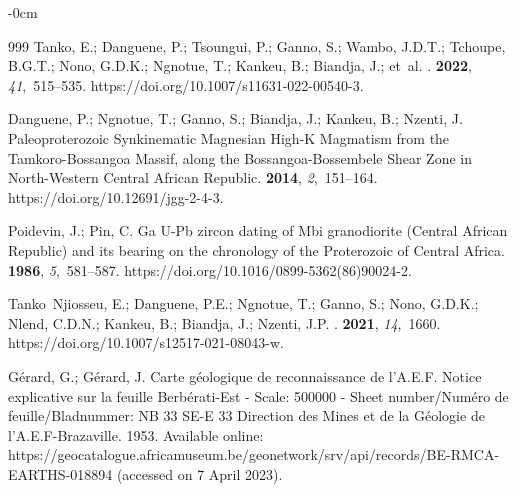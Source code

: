\documentclass[minerals,article,accept,pdftex,moreauthors]{Definitions/mdpi}
\begin{document}
\begin{adjustwidth}{-\extralength}{0cm}
\begin{thebibliography}{999}
Tanko, E.; Danguene, P.; Tsoungui, P.; Ganno, S.; Wambo, J.D.T.; Tchoupe,
  B.G.T.; Nono, G.D.K.; Ngnotue, T.; Kankeu, B.; Biandja, J.;  et~al.
.
 {\bf 2022}, {\em 41},~515--535.
\newblock https://doi.org/10.1007/s11631-022-00540-3.

Danguene, P.; Ngnotue, T.; Ganno, S.; Biandja, J.; Kankeu, B.; Nzenti, J.
\newblock Paleoproterozoic Synkinematic Magnesian High-K Magmatism from the
  Tamkoro-Bossangoa Massif, along the Bossangoa-Bossembele Shear Zone in
  North-Western Central African Republic.
 {\bf 2014}, {\em
  2},~151--164.
\newblock https://doi.org/10.12691/jgg-2-4-3.

Poidevin, J.; Pin, C.
 Ga U-Pb zircon dating of Mbi granodiorite (Central African
  Republic) and its bearing on the chronology of the Proterozoic of Central
  Africa.
 {\bf 1986}, {\em
  5},~581--587.
\newblock https://doi.org/10.1016/0899-5362(86)90024-2.
\newpage

Tanko~Njiosseu, E.; Danguene, P.E.; Ngnotue, T.; Ganno, S.; Nono, G.D.K.;
  Nlend, C.D.N.; Kankeu, B.; Biandja, J.; Nzenti, J.P.
.
 {\bf 2021}, {\em 14},~1660.
\newblock https://doi.org/10.1007/s12517-021-08043-w.

Gérard, G.; Gérard, J.
\newblock Carte géologique de reconnaissance de l'A.E.F.
\newblock  Notice explicative sur la feuille Berbérati-Est - Scale: 500000 - Sheet number/Numéro de feuille/Bladnummer: NB 33 SE-E 33
Direction des Mines
  et de la Géologie de l'A.E.F-Brazaville. {1953.}  Available online: https://geocatalogue.africamuseum.be/geonetwork/srv/api/records/BE-RMCA-EARTHS-018894 (accessed on 7 April 2023).  %


\end{thebibliography}
\end{adjustwidth}
\end{document}
